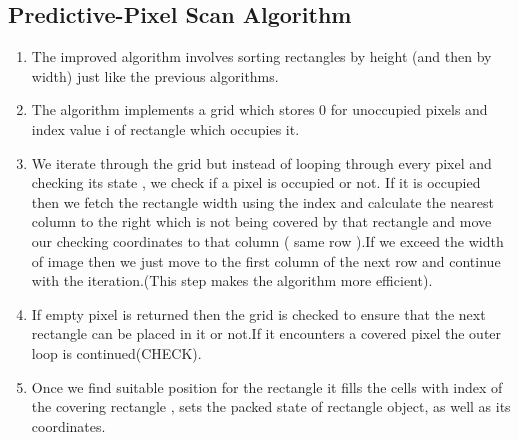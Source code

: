 \documentclass[12pt, a4paper,openany]{article}
\begin{document}
\subsection{Predictive-Pixel Scan Algorithm}
\begin{flushleft}
\begin{enumerate}
    \item The improved algorithm involves sorting rectangles by height (and then by width) just like the previous algorithms.
    \item The algorithm implements a grid which stores 0 for unoccupied pixels and index value i of rectangle which occupies it.
    \item We iterate through the grid but instead of  looping through every pixel and checking its state , we check if a pixel is occupied or not. If it is occupied then we fetch the rectangle width using the index and calculate the nearest column to the right which is not being covered by that rectangle and move our checking coordinates to that column ( same row ).If we exceed the width of image then we just move to the first column of the next row and continue with the iteration.(This step makes the algorithm more efficient).
    \item If empty pixel is returned then the grid is checked to ensure that the next rectangle can be placed in it or not.If it encounters a covered pixel the outer loop is continued(CHECK).
    \item Once we find suitable position for the rectangle it fills the cells with index of the covering rectangle , sets the packed state of rectangle object, as well as its coordinates. 
\end{enumerate}

\end{flushleft}

\begin{center}
    

\end{center}
\end{document}
